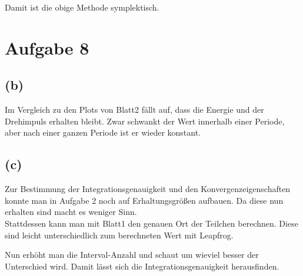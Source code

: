 \documentclass[a4paper,10pt]{article}
\begin{document}
Damit ist die obige Methode symplektisch.

\section{Aufgabe 8}

\subsection{(b)}
Im Vergleich zu den Plots von Blatt2 fällt auf, dass die Energie und der Drehimpuls erhalten bleibt.
Zwar schwankt der Wert innerhalb einer Periode, aber nach einer ganzen Periode ist er wieder konstant.

\subsection{(c)}
Zur Bestimmung der Integrationsgenauigkeit und den Konvergenzeigenschaften
konnte man in Aufgabe 2 noch auf Erhaltungsgrößen aufbauen. Da diese nun erhalten
sind macht es weniger Sinn.\\

Stattdessen kann man mit Blatt1 den genauen Ort der Teilchen berechnen. Diese
sind leicht unterschiedlich zum berechneten Wert mit Leapfrog.

Nun erhöht man die Interval-Anzahl und schaut um wieviel besser der Unterschied wird.
Damit lässt sich die Integrationsgenauigkeit herausfinden.
\end{document}

